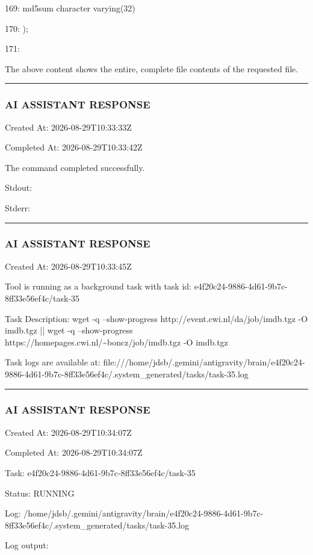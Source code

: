 \documentclass[11pt,a4paper]{article}
\begin{document}
169:     md5sum character varying(32)

170: );

171:

The above content shows the entire, complete file contents of the requested file.


\hrule

\subsubsection{AI ASSISTANT RESPONSE}

Created At: 2026-08-29T10:33:33Z

Completed At: 2026-08-29T10:33:42Z


The command completed successfully.

Stdout:


Stderr:


\hrule

\subsubsection{AI ASSISTANT RESPONSE}

Created At: 2026-08-29T10:33:45Z

Tool is running as a background task with task id: e4f20c24-9886-4d61-9b7c-8ff33e56ef4c/task-35

Task Description: wget -q --show-progress http://event.cwi.nl/da/job/imdb.tgz -O imdb.tgz || wget -q --show-progress https://homepages.cwi.nl/\textasciitilde{}boncz/job/imdb.tgz -O imdb.tgz

Task logs are available at: file:///home/jdsb/.gemini/antigravity/brain/e4f20c24-9886-4d61-9b7c-8ff33e56ef4c/.system\_generated/tasks/task-35.log


\hrule

\subsubsection{AI ASSISTANT RESPONSE}

Created At: 2026-08-29T10:34:07Z

Completed At: 2026-08-29T10:34:07Z

Task: e4f20c24-9886-4d61-9b7c-8ff33e56ef4c/task-35

Status: RUNNING

Log: /home/jdsb/.gemini/antigravity/brain/e4f20c24-9886-4d61-9b7c-8ff33e56ef4c/.system\_generated/tasks/task-35.log

Log output:
\end{document}
